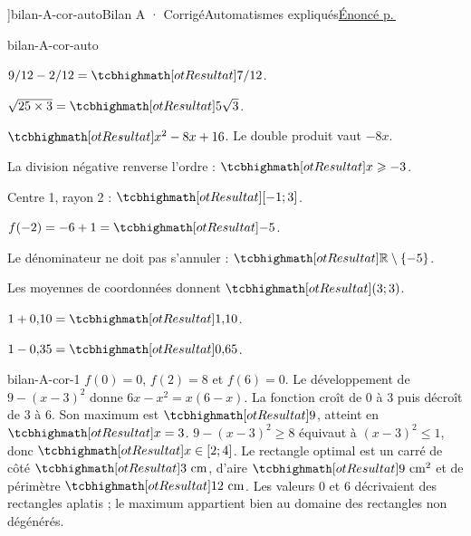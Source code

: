 \editionPage[\pdfbookmark[0]{Corrigés des bilans}{bm-bilan-A-cor-auto-parent}]{bilan-A-cor-auto}{Bilan A · Corrigé}{Automatismes expliqués}{\hyperref[bilan-A-auto]{Énoncé p.\,\pageref*{bilan-A-auto}}}
\begin{blocEdition}{bilan-A-cor-auto}
\begin{questions}
\item $9/12-2/12=\res{7/12}$.
\item $\sqrt{25\times3}=\res{5\sqrt3}$.
\item $\res{x^2-8x+16}$. Le double produit vaut $-8x$.
\item La division négative renverse l’ordre : $\res{x\ge-3}$.
\item Centre 1, rayon 2 : $\res{[-1;3]}$.
\item $f(-2)=-6+1=\res{-5}$.
\item Le dénominateur ne doit pas s’annuler : $\res{\mathbb R\setminus\{-5\}}$.
\item Les moyennes de coordonnées donnent $\res{(3;3)}$.
\item $1+0{,}10=\res{1{,}10}$.
\item $1-0{,}35=\res{0{,}65}$.
\end{questions}
\end{blocEdition}
\begin{blocEdition}{bilan-A-cor-1}
$f(0)=0$, $f(2)=8$ et $f(6)=0$. Le développement de $9-(x-3)^2$ donne $6x-x^2=x(6-x)$.
La fonction croît de 0 à 3 puis décroît de 3 à 6. Son maximum est $\res9$, atteint en $\res{x=3}$.
$9-(x-3)^2\ge8$ équivaut à $(x-3)^2\le1$, donc $\res{x\in[2;4]}$.
Le rectangle optimal est un carré de côté $\res{3\text{ cm}}$, d’aire $\res{9\text{ cm}^2}$ et de périmètre $\res{12\text{ cm}}$. Les valeurs 0 et 6 décrivaient des rectangles aplatis ; le maximum appartient bien au domaine des rectangles non dégénérés.
\label{fig-bilan-A-cor-1}

\end{blocEdition}
